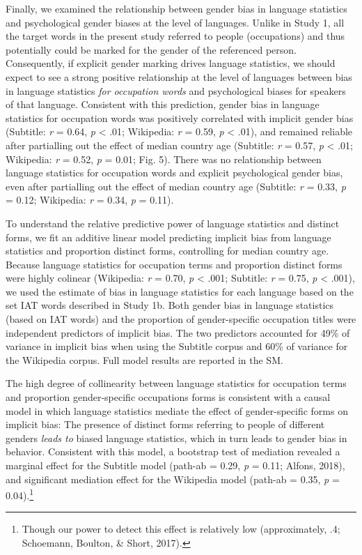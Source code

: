\documentclass[man,floatsintext]{apa6}
\let\rmarkdownfootnote\footnote%
\def\footnote{\protect\rmarkdownfootnote}
\begin{document}
Finally, we examined the relationship between gender bias in language statistics and psychological gender biases at the level of languages. Unlike in Study 1, all the target words in the present study referred to people (occupations) and thus potentially could be marked for the gender of the referenced person. Consequently, if explicit gender marking drives language statistics, we should expect to see a strong positive relationship at the level of languages between bias in language statistics \emph{for occupation words} and psychological biases for speakers of that language. Consistent with this prediction, gender bias in language statistics for occupation words was positively correlated with implicit gender bias (Subtitle: \emph{r} = 0.64, \emph{p} \textless{} .01; Wikipedia: \emph{r} = 0.59, \emph{p} \textless{} .01), and remained reliable after partialling out the effect of median country age (Subtitle: \emph{r} = 0.57, \emph{p} \textless{} .01; Wikipedia: \emph{r} = 0.52, \emph{p} = 0.01; Fig. 5). There was no relationship between language statistics for occupation words and explicit psychological gender bias, even after partialling out the effect of median country age (Subtitle: \emph{r} = 0.33, \emph{p} = 0.12; Wikipedia: \emph{r} = 0.34, \emph{p} = 0.11).

To understand the relative predictive power of language statistics and distinct forms, we fit an additive linear model predicting implicit bias from language statistics and proportion distinct forms, controlling for median country age. Because language statistics for occupation terms and proportion distinct forms were highly colinear (Wikipedia: \emph{r} = 0.70, \emph{p} \textless{} .001; Subtitle: \emph{r} = 0.75, \emph{p} \textless{} .001), we used the estimate of bias in language statistics for each language based on the set IAT words described in Study 1b. Both gender bias in language statistics (based on IAT words) and the proportion of gender-specific occupation titles were independent predictors of implicit bias. The two predictors accounted for 49\% of variance in implicit bias when using the Subtitle corpus and 60\% of variance for the Wikipedia corpus. Full model results are reported in the SM.

The high degree of collinearity between language statistics for occupation terms and proportion gender-specific occupations forms is consistent with a causal model in which language statistics mediate the effect of gender-specific forms on implicit bias: The presence of distinct forms referring to people of different genders \emph{leads to} biased language statistics, which in turn leads to gender bias in behavior. Consistent with this model, a bootstrap test of mediation revealed a marginal effect for the Subtitle model (path-ab = 0.29, \emph{p} = 0.11; Alfons, 2018), and significant mediation effect for the Wikipedia model (path-ab = 0.35, \emph{p} = 0.04).\footnote{Though our power to detect this effect is relatively low (approximately, .4; Schoemann, Boulton, \& Short, 2017).}
\end{document}
